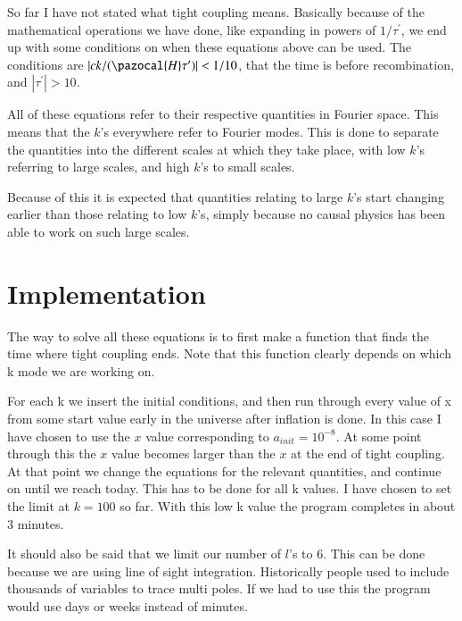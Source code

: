 \documentclass[a4paper]{report}
\begin{document}
So far I have not stated what tight coupling means. Basically because of the mathematical operations we have done, like expanding in powers of $1/\tau^\prime$, we end up with some conditions on when these equations above can be used. The conditions are $|ck/(\pazocal{H}\tau^\prime)| < 1/10$, that the time is before recombination, and $|\tau^\prime|>10$.
 
All of these equations refer to their respective quantities in Fourier space. This means that the $k$'s everywhere refer to Fourier modes. This is done to separate the quantities into the different scales at which they take place, with low $k$'s referring to large scales, and high $k$'s to small scales.

Because of this it is expected that quantities relating to large $k$'s start changing earlier than those relating to low $k$'s, simply because no causal physics has been able to work on such large scales.
 
\section{Implementation}\label{sec:Imp}
The way to solve all these equations is to first make a function that finds the time where tight coupling ends.
Note that this function clearly depends on which k mode we are working on.

For each k we insert the initial conditions, and then run through every value of x from some start value early in the universe after inflation is done. In this case I have chosen to use the $x$ value corresponding to $a_{init} = 10^{-8}$.
At some point through this the $x$ value becomes larger than the $x$ at the end of tight coupling. At that point we change the equations for the relevant quantities, and continue on until we reach today.
This has to be done for all k values. I have chosen to set the limit at $k=100$ so far. With this low k value the program completes in about 3 minutes.

It should also be said that we limit our number of $l$'s to 6. This can be done because we are using line of sight integration. Historically people used to include thousands of variables to trace multi poles. If we had to use this the program would use days or weeks instead of minutes.

\end{document}
